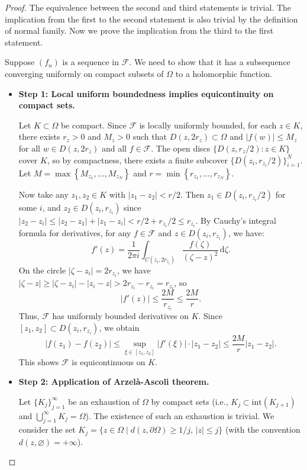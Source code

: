 \documentclass{article}
\theoremstyle{definition}
\newcommand{\dd}{\mathrm{d}}
\renewcommand{\leq}{\leqslant}
\renewcommand{\geq}{\geqslant}
\begin{document}
\begin{proof}
    The equivalence between the second and third statements is trivial. The implication from the first to the second statement is also trivial by the definition of normal family. Now we prove the implication from the third to the first statement. 

    Suppose $(f_n)$ is a sequence in $\mathcal{F}$. We need to show that it has a subsequence converging uniformly on compact subsets of $\Omega$ to a holomorphic function.
    \begin{itemize}
    \item\textbf{Step 1: Local uniform boundedness implies equicontinuity on compact sets.}
    
    Let $K \subset \Omega$ be compact. Since $\mathcal{F}$ is locally uniformly bounded, for each $z \in K$, there exists $r_z > 0$ and $M_z > 0$ such that $D(z, 2r_z) \subset \Omega$ and $|f(w)| \leq M_z$ for all $w \in D(z, 2r_z)$ and all $f \in \mathcal{F}$.
    The open discs $\{D(z, r_z/2) \colon z \in K\}$ cover $K$, so by compactness, there exists a finite subcover $\{D(z_i, r_{z_i}/2)\}_{i=1}^N$. Let $M = \max\left\{M_{z_1}, \dots, M_{z_N}\right\}$ and $r = \min\left\{r_{z_1}, \dots, r_{z_N}\right\}$.
    
    Now take any $z_1, z_2 \in K$ with $|z_1 - z_2| < r/2$. Then $z_1 \in D(z_i, r_{z_i}/2)$ for some $i$, and $z_2 \in D(z_i, r_{z_i})$ since $|z_2 - z_i| \leq |z_2 - z_1| + |z_1 - z_i| < r/2 + r_{z_i}/2 \leq r_{z_i}$.
    By Cauchy's integral formula for derivatives, for any $f \in \mathcal{F}$ and $z \in D(z_i, r_{z_i})$, we have:
    \[
    f'(z) = \frac{1}{2\pi i} \int_{C\left(z_i, 2r_{z_i}\right)} \frac{f(\zeta)}{(\zeta - z)^2}\,\dd\zeta.
    \]
    On the circle $|\zeta - z_i| = 2r_{z_i}$, we have $|\zeta - z| \geq |\zeta - z_i| - |z_i - z| > 2r_{z_i} - r_{z_i} = r_{z_i}$, so
    \[
    |f'(z)| \leq \frac{2M}{r_{z_i}} \leq \frac{2M}{r}.
    \]
    Thus, $\mathcal{F}$ has uniformly bounded derivatives on $K$. Since $[z_1, z_2] \subset D(z_i, r_{z_i})$, we obtain
    \[
    |f(z_1) - f(z_2)| \leq \sup_{\xi \in [z_1,z_2]} |f'(\xi)| \cdot |z_1 - z_2| \leq \frac{2M}{r} |z_1 - z_2|.
    \]
    This shows $\mathcal{F}$ is equicontinuous on $K$.

    \item\textbf{Step 2: Application of Arzelà-Ascoli theorem.}
    
    Let $\{K_j\}_{j=1}^\infty$ be an exhaustion of $\Omega$ by compact sets (i.e., $K_j \subset \text{int}(K_{j+1})$ and $\bigcup_{j=1}^\infty K_j = \Omega$). The existence of such an exhaustion is trivial. 
    We consider the set $K_j=\{z\in \Omega\mid d(z,\partial \Omega)\geq 1/j,\, |z|\leq j\}$ (with the convention \(d(z,\varnothing)=+\infty\)).
    

\end{itemize}
\end{proof}
\end{document}
